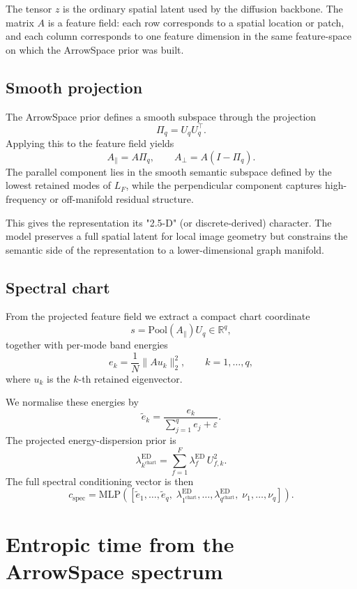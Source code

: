 \documentclass[11pt]{article}
\newcommand{\Lf}{L_F}
\newcommand{\Uq}{U_q}
\newcommand{\ed}{\lambda^{\mathrm{ED}}}
\newcommand{\R}{\mathbb{R}}
\begin{document}
The tensor $z$ is the ordinary spatial latent used by the diffusion backbone.
The matrix $A$ is a feature field: each row corresponds to a spatial location
or patch, and each column corresponds to one feature dimension in the same
feature-space on which the ArrowSpace prior was built.

\subsection{Smooth projection}
\label{sec:smooth_projection}

The ArrowSpace prior defines a smooth subspace through the projection
\[\Pi_q = \Uq \Uq^\top.\]
Applying this to the feature field yields
\[A_{\parallel} = A \Pi_q, \qquad A_{\perp} = A(I - \Pi_q).\]
The parallel component lies in the smooth semantic subspace defined by the
lowest retained modes of $\Lf$, while the perpendicular component captures
high-frequency or off-manifold residual structure.

This gives the representation its "2.5-D" (or discrete-derived) character. The model preserves a full
spatial latent for local image geometry but constrains the semantic side of
the representation to a lower-dimensional graph manifold.

\subsection{Spectral chart}
\label{sec:spectral_chart}

From the projected feature field we extract a compact chart coordinate
\[s = \mathrm{Pool}(A_{\parallel}) \Uq \in \R^q,\]
together with per-mode band energies
\[e_k = \frac{1}{N}\|A u_k\|_2^2, \qquad k=1,\ldots,q,\]
where $u_k$ is the $k$-th retained eigenvector.

We normalise these energies by
\[\tilde e_k = \frac{e_k}{\sum_{j=1}^q e_j + \varepsilon}.\]
The projected energy-dispersion prior is
\[\ed_{k^{\mathrm{chart}}} = \sum_{f=1}^{F} \ed_f \, U_{f,k}^2.\]
The full spectral conditioning vector is then
\[c_{\mathrm{spec}} = \mathrm{MLP} \left( [\tilde e_1,\ldots,\tilde e_q,\; \ed_{1^{\mathrm{chart}}},\ldots,\ed_{q^{\mathrm{chart}}},\; \nu_1,\ldots,\nu_q] \right).\]


\section{Entropic time from the ArrowSpace spectrum}
\label{sec:entropic_clock}
\end{document}

